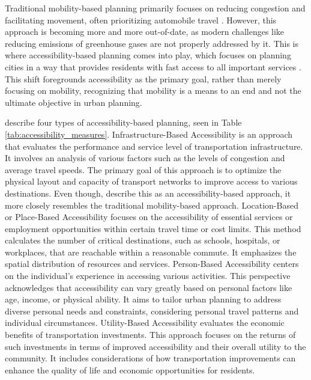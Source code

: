 Traditional mobility-based planning primarily focuses on reducing congestion and facilitating movement, often prioritizing automobile travel .
However, this approach is becoming more and more out-of-date, as modern challenges like reducing emissions of greenhouse gases are not properly addressed by it.
This is where accessibility-based planning comes into play, which focuses on planning cities in a way that provides residents with fast access to all important services .
This shift foregrounds accessibility as the primary goal, rather than merely focusing on mobility, recognizing that mobility is a means to an end and not the ultimate objective in urban planning. 

 describe four types of accessibility-based planning, seen in Table \ref{tab:accessibility_measures}.
Infrastructure-Based Accessibility is an approach that evaluates the performance and service level of transportation infrastructure.
It involves an analysis of various factors such as the levels of congestion and average travel speeds. 
The primary goal of this approach is to optimize the physical layout and capacity of transport networks to improve access to various destinations.
Even though,  describe this as an accessibility-based approach, it more closely resembles the traditional mobility-based approach.
Location-Based or Place-Based Accessibility focuses on the accessibility of essential services or employment opportunities within certain travel time or cost limits. 
This method calculates the number of critical destinations, such as schools, hospitals, or workplaces, that are reachable within a reasonable commute. It emphasizes the spatial distribution of resources and services.
Person-Based Accessibility centers on the individual’s experience in accessing various activities. This perspective acknowledges that accessibility can vary greatly based on personal factors like age, income, or physical ability. It aims to tailor urban planning to address diverse personal needs and constraints, considering personal travel patterns and individual circumstances.
Utility-Based Accessibility evaluates the economic benefits of transportation investments. 
This approach focuses on the returns of such investments in terms of improved accessibility and their overall utility to the community. 
It includes considerations of how transportation improvements can enhance the quality of life and economic opportunities for residents.

